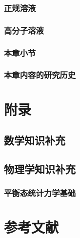 \documentclass[
  zihao=5,
  linespread=1.3,
  a4paper,
  heading=true,
  twoside
]{ctexbook}
\theoremstyle{definition}
\theoremstyle{plain}
\begin{document}
\section{正规溶液}

\section{高分子溶液}

\section{本章小节}

\section{本章内容的研究历史}


\part*{附录}
\chapter{数学知识补充}

\chapter{物理学知识补充}
\section{平衡态统计力学基础}


\newpage\part*{参考文献}
\printbibliography[heading=none]
\end{document}
